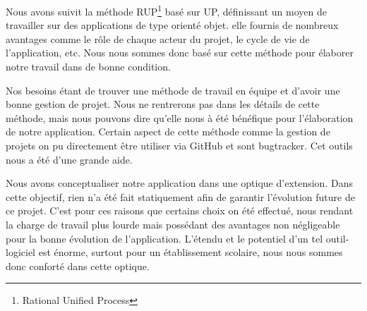 Nous avons suivit la méthode RUP\footnote{Rational Unified Process} basé sur UP, définissant un moyen de travailler sur des applications de type orienté objet. elle fournis de nombreux avantages comme le rôle de chaque acteur du projet, le cycle de vie de l'application, etc. Nous nous sommes donc basé sur cette méthode pour élaborer notre travail dans de bonne condition.

Nos besoins étant de trouver une méthode de travail en équipe et d'avoir une bonne gestion de projet. Nous ne rentrerons pas dans les détails de cette méthode, mais nous pouvons dire qu'elle nous à été bénéfique pour l'élaboration de notre application. Certain aspect de cette méthode comme la gestion de projets on pu directement être utiliser via GitHub et sont bugtracker. Cet outils nous a été d'une grande aide.

Nous avons conceptualiser notre application dans une optique d'extension. Dans cette objectif, rien n'a été fait statiquement afin de garantir l'évolution future de ce projet. C'est pour ces raisons que certains choix on été effectué, nous rendant la charge de travail plus lourde mais possédant des avantages non négligeable pour la bonne évolution de l'application. L'étendu et le potentiel d'un tel outil-logiciel est énorme, surtout pour un établissement scolaire, nous nous sommes donc conforté dans cette optique.
    
%    
%
